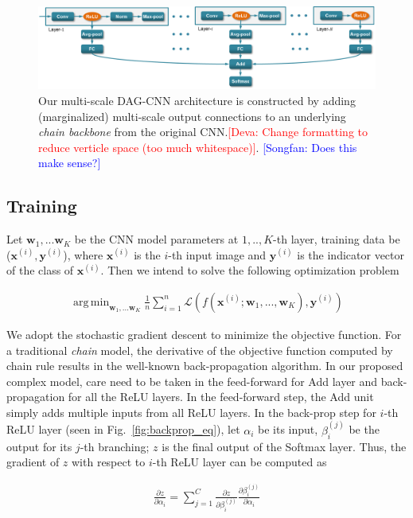 \documentclass[10pt,twocolumn,letterpaper]{article}
\DeclareMathOperator*{\argmin}{arg\,min}
\newcommand{\deva}[1]{\textcolor{red}{[Deva: #1]}}
\newcommand{\songfan}[1]{\textcolor{blue}{[Songfan: #1]}}
\begin{document}
\begin{figure}[t!]
\centering
	\includegraphics[width=\textwidth]{fig/fig_model.png}
\caption{Our multi-scale DAG-CNN architecture is constructed by adding (marginalized) multi-scale output connections to an underlying {\em chain backbone} from the original CNN.\deva{Change formatting to reduce verticle space (too much whitespace)}. \songfan{Does this make sense?}}
\label{fig:model}
\end{figure}

\subsection{Training}

Let $\textbf{w}_1,...\textbf{w}_K$ be the CNN model parameters at $1,..,K$-th layer, training data be ($\textbf{x}^{(i)},\textbf{y}^{(i)}$), where $\textbf{x}^{(i)}$ is the $i$-th input image and $\textbf{y}^{(i)}$ is the indicator vector of the class of $\textbf{x}^{(i)}$. Then we intend to solve the following optimization problem

\begin{align}
\argmin_{\textbf{w}_1,...\textbf{w}_K} \frac{1}{n}\sum_{i=1}^{n} \mathcal{L}(f(\textbf{x}^{(i)};\textbf{w}_1,...,\textbf{w}_K),\textbf{y}^{(i)})
\end{align}

We adopt the stochastic gradient descent to minimize the objective function. For a traditional \textit{chain} model, the derivative of the objective function computed by chain rule results in the well-known back-propagation algorithm. In our proposed complex model, care need to be taken in the feed-forward for Add layer and back-propagation for all the ReLU layers. In the feed-forward step, the Add unit simply adds multiple inputs from all ReLU layers. In the back-prop step for $i$-th ReLU layer (seen in Fig.~\ref{fig:backprop_eq}), let $\alpha_i$ be its input, $\beta_i^{(j)}$ be the output for its $j$-th branching; $z$ is the final output of the Softmax layer. Thus, the gradient of $z$ with respect to $i$-th ReLU layer can be computed as

\begin{align}
\frac{\partial z}{\partial \alpha_i}=\sum_{j=1}^{C}\frac{\partial z}{\partial \beta_i^{(j)}}\frac{\partial \beta_i^{(j)}}{\partial \alpha_i}
\end{align}
\end{document}

